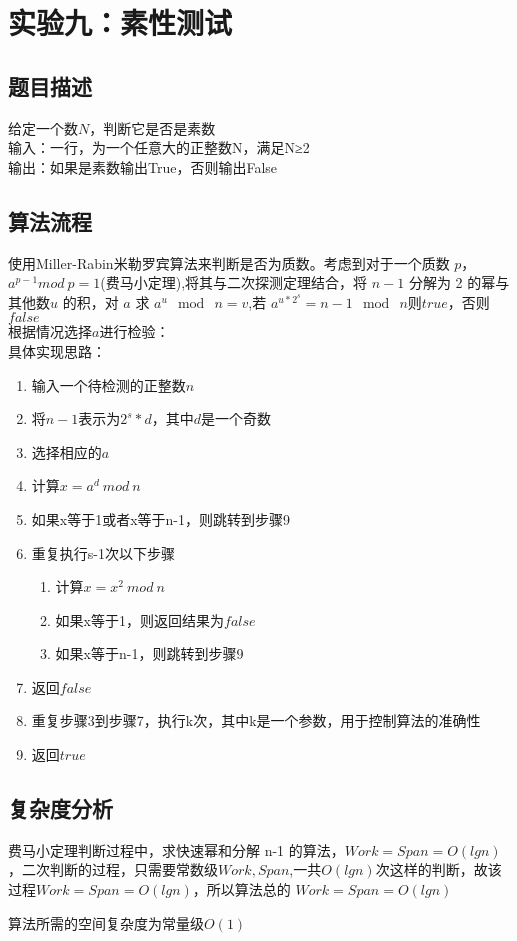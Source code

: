 \documentclass[UTF8,a4paperdui, %
]{ctexart}
\begin{document}
\section{实验九：素性测试}

\subsection{题目描述}
给定一个数$N$，判断它是否是素数\\
输入：一行，为一个任意大的正整数N，满足N≥2\\
输出：如果是素数输出True，否则输出False
\subsection{算法流程}
使用Miller-Rabin米勒罗宾算法来判断是否为质数。考虑到对于一个质数 $p$，$a^{p-1}mod\ p=1$(费马小定理),将其与二次探测定理结合，将 $n-1$ 分解为 2 的幂与其他数$ u$ 的积，对 $a$ 求 $a^u \mod\ n=v$,若 $a^{u*2^s}=n-1 \mod\ n $则$ true$，否则$false$\\
根据情况选择$a$进行检验：
\\
具体实现思路：
\begin{enumerate}
    \item 输入一个待检测的正整数$n$
    \item 将$n-1$表示为$2^s * d$，其中$d$是一个奇数
    \item 选择相应的$a$
    \item 计算$x = a^d\ mod\ n$
    \item 如果x等于1或者x等于n-1，则跳转到步骤9
    \item 重复执行s-1次以下步骤\begin{enumerate}
        \item 计算$x = x^2\ mod\ n$
        \item 如果x等于1，则返回结果为$false$
        \item 如果x等于n-1，则跳转到步骤9
    \end{enumerate}
    \item 返回$false$
    \item 重复步骤3到步骤7，执行k次，其中k是一个参数，用于控制算法的准确性
    \item 返回$true$
\end{enumerate}
\subsection{复杂度分析}
费马小定理判断过程中，求快速幂和分解 n-1 的算法，$ Work=Span=O(lgn)$，二次判断的过程，只需要常数级$Work,Span$,一共$O(lgn)$次这样的判断，故该过程$Work=Span=O(lgn)$，所以算法总的 $Work=Span=O(lgn)$
\par 算法所需的空间复杂度为常量级$O(1)$
\end{document}
